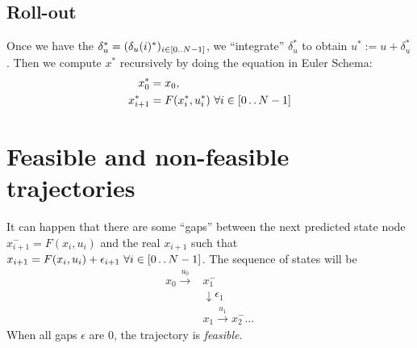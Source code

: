 \documentclass{report}
\newcommand{\twodots}{\mathinner {\ldotp \ldotp}}
\begin{document}
\subsection{Roll-out}
Once we have the $\delta_u^* = (\delta_u(i)^*)_{i \in [0 \twodots N-1]}$, we ``integrate'' $\delta_u^*$ to obtain $u^* := u + \delta_u^*$. Then we compute $x^*$ recursively by doing the equation in Euler Schema:
\begin{equation}
\begin{split}
x^*_0      &= x_0,  \\ %
x_{i+1}^*     &= F(x_i^*, u_i^*) \ \forall i \in [0 \twodots N-1]
\end{split}
\end{equation}
\section{Feasible and non-feasible trajectories}
It can happen that there are some ``gaps'' between the next predicted state node $x_{i+1}^- = F(x_i, u_i)$ and the real $x_{i+1}$ such that $x_{i+1}  = F(x_i, u_i) + \epsilon_{i+1} \ \forall i \in [0 \twodots N-1]$. 
The sequence of states will be
\begin{align*}
x_0 \xrightarrow{u_0} &x_1^- \\
						&\downarrow \epsilon_1\\
						&x_1\xrightarrow{u_1} x_2^- ...
\end{align*}
When all gaps $\epsilon$ are $0$, the trajectory is \emph{feasible}. 
\end{document}
